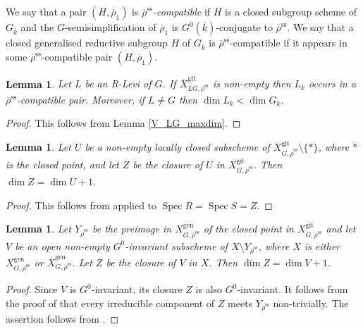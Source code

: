 \documentclass{amsart}
\newtheorem{lem}[prop]{Lemma}
\theoremstyle{definition}
\theoremstyle{remark}
\DeclareMathOperator{\Spec}{Spec}
\newcommand{\rhobar}{\overline{\rho}}
\newcommand{\gen}{\mathrm{gen}}
\newcommand{\gps}{\mathrm{git}}
\newcommand{\Xbar}{\overline{X}}
\newcommand{\kbar}{\overline{k}}
\newcommand{\rhobarss}{\rhobar^{\mathrm{ss}}}
\begin{document}
We say that a pair $(H,\rhobar_1)$ is \emph{$\rhobarss$-compatible}
if $H$ is a closed subgroup scheme of $G_{\kbar}$ and the $G$-semisimplification of 
$\rhobar_1$ is $G^0(\overline{k})$-conjugate to $\rhobarss$.
We say that a closed generalised reductive subgroup $H$ of $G_{\kbar}$ is 
$\rhobarss$-compatible if it appears in some $\rhobarss$-compatible 
pair $(H,\rhobar_1)$.



\begin{lem}\label{L_compatible} Let $L$ be an R-Levi of $G$. If $\Xbar^{\gps}_{LG, \rhobarss}$ 
is non-empty then $L_k$ occurs in a $\rhobarss$-compatible pair. Moreover, if $L\neq G$ then $\dim L_k <\dim G_k$.
\end{lem} 
\begin{proof} This follows from Lemma \ref{V_LG_maxdim}.
\end{proof}


\begin{lem}\label{useful_U} Let $U$ be a non-empty locally closed subscheme of 
$X^{\gps}_{G, \rhobarss}\setminus\{ \ast\}$, 
where $\ast$ is the closed point, and let $Z$ be the closure of $U$ in $X^{\gps}_{G, \rhobarss}$.
Then $\dim Z= \dim U+1$.
\end{lem}

\begin{proof} This follows from \cite[Lemma 3.5 (5)]{BIP_new} applied
to $\Spec R=\Spec S= Z$.
\end{proof} 

\begin{lem}\label{useful_V} Let $Y_{\rhobarss}$ be the preimage in $X^{\gen}_{G, \rhobarss}$ of the closed point in $X^{\gps}_{G, \rhobarss}$ and let 
$V$ be an open  non-empty $G^0$-invariant subscheme of $X\setminus Y_{\rhobarss}$, where $X$ is either $X^{\gen}_{G, \rhobarss}$ or  $\Xbar^{\gen}_{G, \rhobarss}$.
Let $Z$ be the closure of $V$ in $X$. Then $\dim Z=\dim V+1$. 
\end{lem}
\begin{proof} Since $V$ is $G^0$-invariant, its closure $Z$ is also
$G^0$-invariant. It follows from the proof of \cite[Lemma 3.21]{BIP_new} that every irreducible component 
of $Z$ meets $Y_{\rhobarss}$ non-trivially. The assertion follows from \cite[Lemma 3.18 (5)]{BIP_new}. 
\end{proof} 
\end{document}
